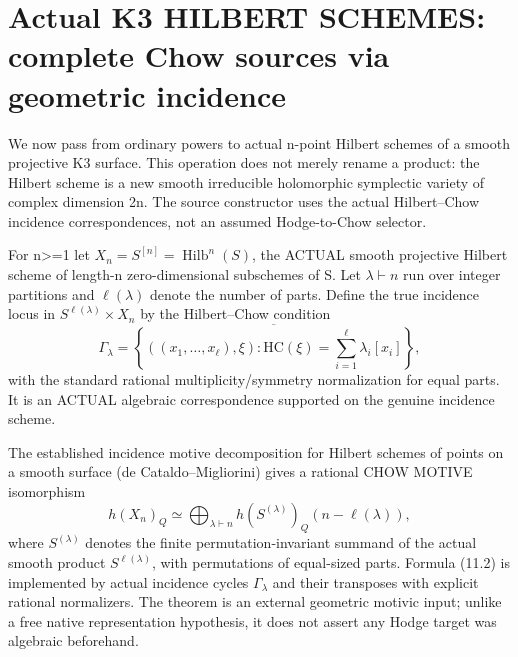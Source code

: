 \documentclass[11pt]{article}
\begin{document}
\section{Actual K3 HILBERT SCHEMES: complete Chow sources via geometric incidence}
We now pass from ordinary powers to actual
n-point Hilbert schemes of a smooth
projective K3 surface. This operation
does not merely rename a product:
the Hilbert scheme is a new smooth
irreducible holomorphic symplectic
variety of complex dimension 2n.
The source constructor uses the
actual Hilbert--Chow incidence
correspondences, not an assumed
Hodge-to-Chow selector.

For n>=1 let
\(
 X_n=S^{[n]}=\operatorname{Hilb}^n(S)
\),
the ACTUAL smooth projective Hilbert
scheme of length-n zero-dimensional
subschemes of S. Let \(\lambda\vdash n\)
run over integer partitions and
\(\ell(\lambda)\) denote the number
of parts. Define the true incidence
locus in \(S^{\ell(\lambda)}\times X_n\)
by the Hilbert--Chow condition
\[
 \Gamma_\lambda=
 \overline{\left\{((x_1,\ldots,x_{\ell}),\xi):
    \mathrm{HC}(\xi)=
              \sum_{i=1}^{\ell}\lambda_i[x_i]\right\}},
                                                               \tag{11.1}
\]
with the standard rational
multiplicity/symmetry normalization
for equal parts. It is an ACTUAL
algebraic correspondence supported
on the genuine incidence scheme.

The established incidence motive
decomposition for Hilbert schemes
of points on a smooth surface
(de Cataldo--Migliorini) gives a
rational CHOW MOTIVE isomorphism
\[
 \boxed{
 h(X_n)_Q\simeq
 \bigoplus_{\lambda\vdash n}
       h(S^{(\lambda)})_Q
                      (n-\ell(\lambda)),
 }                                                       \tag{11.2}
\]
where \(S^{(\lambda)}\) denotes
the finite permutation-invariant
summand of the actual smooth
product \(S^{\ell(\lambda)}\),
with permutations of equal-sized
parts. Formula (11.2) is
implemented by actual incidence
cycles \(\Gamma_\lambda\) and
their transposes with explicit
rational normalizers. The theorem
is an external geometric motivic
input; unlike a free native
representation hypothesis, it
does not assert any Hodge target
was algebraic beforehand.
\end{document}
